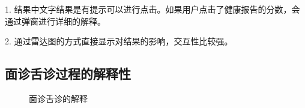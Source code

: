 1. 结果中文字结果是有提示可以进行点击。如果用户点击了健康报告的分数，会通过弹窗进行详细的解释。

2. 通过雷达图的方式直接显示对结果的影响，交互性比较强。

\subsection{面诊舌诊过程的解释性}

\begin{figure}
    \centering
    \caption{面诊舌诊的解释}
    \label{fig:face_diags}
\end{figure}

